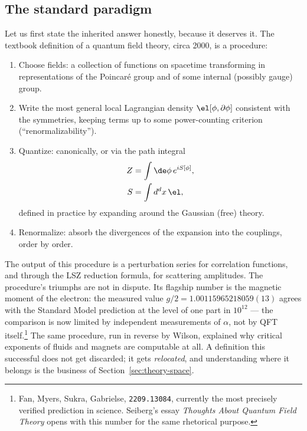 \subsection{The standard paradigm}
\label{sec:standard-paradigm}

Let us first state the inherited answer honestly, because it deserves it. The
textbook definition of a quantum field theory, circa 2000, is a procedure:

\begin{enumerate}
\item Choose fields: a collection of functions on spacetime transforming in
representations of the Poincar\'e group and of some internal (possibly gauge)
group.
\item Write the most general local Lagrangian density $\el[\phi, \partial\phi]$
consistent with the symmetries, keeping terms up to some power-counting
criterion (``renormalizability'').
\item Quantize: canonically, or via the path integral
\begin{equation}
\begin{aligned}
Z &= \int \de\phi\, e^{iS[\phi]},\\
S &= \int d^dx\, \el ,
\end{aligned}
\label{eq:formal-pi}
\end{equation}
defined in practice by expanding around the Gaussian (free) theory.
\item Renormalize: absorb the divergences of the expansion into the couplings,
order by order.
\end{enumerate}

\noin The output of this procedure is a perturbation series for correlation
functions, and through the LSZ reduction formula, for scattering
amplitudes. The procedure's triumphs are not in dispute. Its flagship
number is the magnetic moment of the electron: the measured value $g/2 =
1.00115965218059(13)$ agrees with the Standard Model prediction
at the level of one part in $10^{12}$ --- the comparison is now limited by
independent measurements of $\alpha$, not by QFT itself.\footnote{Fan,
Myers, Sukra, Gabrielse, \texttt{2209.13084}, currently the most precisely
verified prediction in science. Seiberg's essay \emph{Thoughts About
Quantum Field Theory} opens with this number for the same rhetorical
purpose.} The same procedure, run in reverse by Wilson, explained why
critical exponents of fluids and magnets are computable at all. A
definition this successful does not get discarded; it gets
\emph{relocated}, and understanding where it belongs is the business of
Section~\ref{sec:theory-space}.

